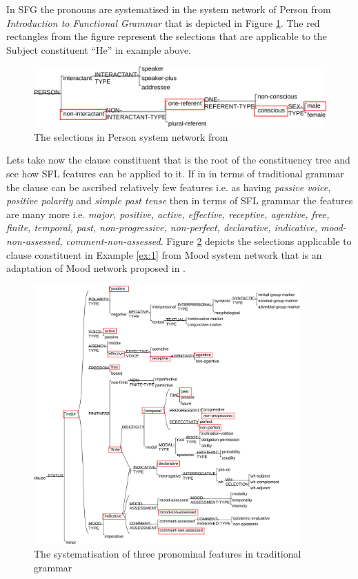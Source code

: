 In SFG the pronouns are systematised in the system network of Person from \textit{Introduction to Functional Grammar} \citep[366]{Halliday2013} that is depicted in Figure \ref{fig:person-system-network}. The red rectangles from the figure represent the selections that are applicable to the Subject constituent ``He'' in example above.

\begin{figure}[!ht]
    \centering      
    \includegraphics[width=.90\textwidth]{Figures/Example/person-selections.pdf}      
    \caption{The selections in Person system network from \citet[366]{Halliday2013} }
    \label{fig:person-system-network}
\end{figure}

Lets take now the clause constituent that is the root of the constituency tree and see how SFL features can be applied to it. If in in terms of traditional grammar the clause can be ascribed relatively few features i.e. as having \textit{passive voice}, \textit{positive polarity} and \textit{simple past tense} then in terms of SFL grammar the features are many more i.e. \textit{major, positive, active, effective, receptive, agentive, free, finite, temporal, past, non-progressive, non-perfect, declarative, indicative, mood-non-assessed, comment-non-assessed}. Figure \ref{fig:mood-selections} depicts the selections applicable to clause constituent in Example \ref{ex:1} from Mood system network that is an adaptation of Mood network proposed in \citet[162]{Halliday2013}. 

\begin{figure}[!ht]
    \centering      
    \includegraphics[width=0.91\textwidth]{Figures/Example/mood-selections.pdf}      
    \caption{The systematisation of three pronominal features in traditional grammar}
    \label{fig:mood-selections}
\end{figure}

